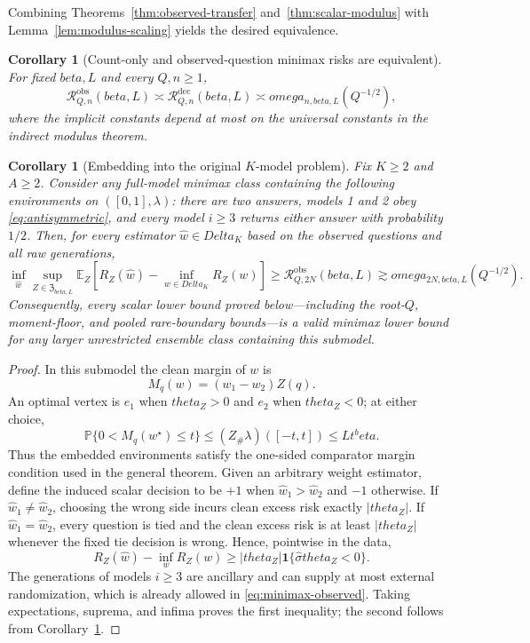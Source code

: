 \documentclass[11pt]{article}
\def\beta{beta}%
\def\theta{theta}%
\def\omega{omega}%
\def\Delta{Delta}%
\newtheorem{corollary}[theorem]{Corollary}
\newcommand{\Pp}{\mathbb P}
\newcommand{\E}{\mathbb E}
\newcommand{\one}{\mathbf 1}
\newcommand{\calR}{\mathcal R}
\begin{document}
Combining Theorems~\ref{thm:observed-transfer} and~\ref{thm:scalar-modulus} with Lemma~\ref{lem:modulus-scaling} yields the desired equivalence.

\begin{corollary}[Count-only and observed-question minimax risks are equivalent]
\label{cor:observed-modulus}
For fixed $\beta,L$ and every $Q,n\ge1$,
\begin{equation}
\label{eq:observed-modulus-equivalence}
\calR^{\mathrm{obs}}_{Q,n}(\beta,L)
\asymp
\calR^{\mathrm{dec}}_{Q,n}(\beta,L)
\asymp
\omega_{n,\beta,L}(Q^{-1/2}),
\end{equation}
where the implicit constants depend at most on the universal constants in the indirect modulus theorem.
\end{corollary}

\begin{corollary}[Embedding into the original $K$-model problem]
\label{cor:general-lower-transfer}
Fix $K\ge2$ and $A\ge2$.  Consider any full-model minimax class containing the following environments on $([0,1],\lambda)$: there are two answers, models 1 and 2 obey \eqref{eq:antisymmetric}, and every model $i\ge3$ returns either answer with probability $1/2$.  Then, for every estimator $\widehat w\in\Delta_K$ based on the observed questions and all raw generations,
\begin{equation}
\label{eq:general-lower-transfer}
\inf_{\widehat w}
\sup_{Z\in\mathfrak Z_{\beta,L}}
\E_Z\!
\left[
R_Z(\widehat w)-\inf_{w\in\Delta_K}R_Z(w)
\right]
\ge
\calR^{\mathrm{obs}}_{Q,2N}(\beta,L)
\gtrsim
\omega_{2N,\beta,L}(Q^{-1/2}).
\end{equation}
Consequently, every scalar lower bound proved below---including the root-$Q$, moment-floor, and pooled rare-boundary bounds---is a valid minimax lower bound for any larger unrestricted ensemble class containing this submodel.
\end{corollary}

\begin{proof}
In this submodel the clean margin of $w$ is
\[
M_q(w)=(w_1-w_2)Z(q).
\]
An optimal vertex is $e_1$ when $\theta_Z>0$ and $e_2$ when $\theta_Z<0$; at either choice,
\[
\Pp\{0<M_q(w^\star)\le t\}
\le
(Z_\#\lambda)([-t,t])
\le Lt^\beta.
\]
Thus the embedded environments satisfy the one-sided comparator margin condition used in the general theorem.  Given an arbitrary weight estimator, define the induced scalar decision to be $+1$ when $\widehat w_1>\widehat w_2$ and $-1$ otherwise.  If $\widehat w_1\ne\widehat w_2$, choosing the wrong side incurs clean excess risk exactly $|\theta_Z|$.  If $\widehat w_1=\widehat w_2$, every question is tied and the clean excess risk is at least $|\theta_Z|$ whenever the fixed tie decision is wrong.  Hence, pointwise in the data,
\[
R_Z(\widehat w)-\inf_wR_Z(w)
\ge
|\theta_Z|\one\{\widehat\sigma\theta_Z<0\}.
\]
The generations of models $i\ge3$ are ancillary and can supply at most external randomization, which is already allowed in \eqref{eq:minimax-observed}.  Taking expectations, suprema, and infima proves the first inequality; the second follows from Corollary~\ref{cor:observed-modulus}.
\end{proof}
\end{document}

